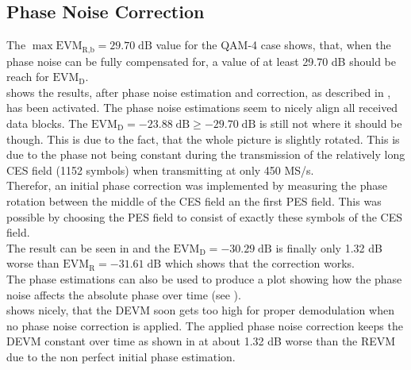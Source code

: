 \subsection{Phase Noise Correction}
\label{sec:res_450_phase}
The $\max \text{EVM}_\text{R,b} = 29.70 \;\text{dB}$ value for the
\gls{QAM}-4 case shows, that, when the phase noise can be fully compensated
for, a value of at least 29.70 dB should be reach for $\text{EVM}_\text{D}$. \\

 shows the results, after phase noise
estimation and correction, as described in , has been
activated. The phase noise estimations seem to nicely align all received
data blocks.
The $\text{EVM}_\text{D} = -23.88 \;\text{dB} \geq -29.70 \;\text{dB}$ is still
not where it should be though. This is due to the fact, that the whole
picture is slightly rotated. This is due to the phase not being
constant during the transmission of the relatively
long \gls{CES} field (1152 symbols) when transmitting at only 450 MS/s. \\

Therefor, an initial phase correction was implemented by measuring the phase
rotation between the middle of the \gls{CES} field an the first \gls{PES}
field. This was possible by choosing the \gls{PES} field to consist
of exactly these symbols of the \gls{CES} field. \\

The result can be seen in  and the
$\text{EVM}_\text{D} = -30.29 \;\text{dB}$ is finally only 1.32 dB worse than
$\text{EVM}_\text{R} = -31.61 \;\text{dB}$ which shows that the correction
works. \\

The phase estimations can also be used to produce a plot showing how the
phase noise affects the absolute phase over time
(see ). \\

 shows nicely, that the \gls{DEVM}
soon gets too high for proper demodulation when no phase noise correction is
applied.
The applied phase noise correction keeps the \gls{DEVM} constant over time
as shown in  at about 1.32 dB
worse than the \gls{REVM} due to the non perfect initial phase
estimation. \\

